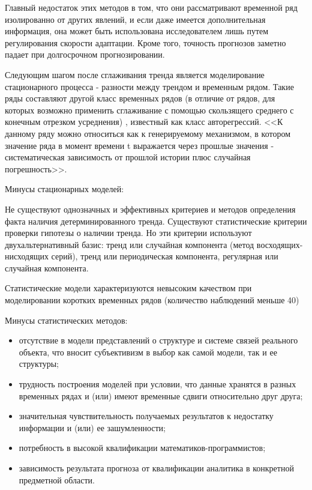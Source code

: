 Главный недостаток этих методов в том, что они рассматривают временной ряд изолированно от других явлений,
и если даже имеется дополнительная информация, она может быть использована исследователем лишь путем регулирования скорости адаптации. Кроме того, точность прогнозов заметно падает при долгосрочном прогнозировании. 

Следующим шагом после сглаживания тренда является моделирование стационарного процесса - разности между трендом и временным рядом. Такие ряды составляют другой класс временных рядов (в отличие от рядов, для которых возможно применить сглаживание с помощью скользящего среднего с конечным отрезком усреднения) , известный как класс авторегрессий. <<К данному ряду можно относиться как к генерируемому механизмом, в котором значение ряда в момент времени t  выражается через прошлые значения - систематическая зависимость от прошлой истории плюс случайная погрешность>>.


Минусы стационарных моделей:

Не существуют однозначных и эффективных критериев и методов определения факта наличия детерминированного тренда. Существуют статистические критерии проверки гипотезы о наличии тренда. Но эти критерии используют двухальтернативный базис: тренд или случайная компонента (метод восходящих-нисходящих серий), тренд или периодическая компонента, регулярная или случайная компонента.

Статистические модели характеризуются невысоким качеством при моделировании коротких временных рядов (количество наблюдений меньше 40)

Минусы статистических методов:
\begin{itemize}
\item отсутствие в модели представлений о структуре и системе связей реального объекта, что вносит субъективизм в выбор как самой модели, так и ее структуры;
\item трудность построения моделей при условии, что данные хранятся в разных временных рядах и (или) имеют временные сдвиги относительно друг друга;
\item значительная чувствительность получаемых результатов к недостатку информации и (или) ее зашумленности;
\item потребность в высокой квалификации математиков-программистов;
\item зависимость результата прогноза от квалификации аналитика в конкретной предметной области. 
\end{itemize}

